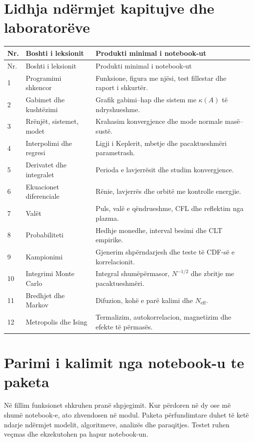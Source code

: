 \section{Lidhja ndërmjet kapitujve dhe laboratorëve}
\begin{longtable}{p{}p{}p{}}
\toprule
Nr. & Boshti i leksionit & Produkti minimal i notebook-ut\\ \midrule
\endfirsthead
\toprule Nr. & Boshti i leksionit & Produkti minimal i notebook-ut\\ \midrule\endhead
1 & Programimi shkencor & Funksione, figura me njësi, test fillestar dhe raport i shkurtër.\\
2 & Gabimet dhe kushtëzimi & Grafik gabimi--hap dhe sistem me $\kappa(A)$ të ndryshueshme.\\
3 & Rrënjët, sistemet, modet & Krahasim konvergjence dhe mode normale masë--sustë.\\
4 & Interpolimi dhe regresi & Ligji i Keplerit, mbetje dhe pacaktueshmëri parametrash.\\
5 & Derivatet dhe integralet & Perioda e lavjerrësit dhe studim konvergjence.\\
6 & Ekuacionet diferenciale & Rënie, lavjerrës dhe orbitë me kontrolle energjie.\\
7 & Valët & Puls, valë e qëndrueshme, CFL dhe reflektim nga plazma.\\
8 & Probabiliteti & Hedhje monedhe, interval besimi dhe CLT empirike.\\
9 & Kampionimi & Gjenerim shpërndarjesh dhe teste të CDF-së e korrelacionit.\\
10 & Integrimi Monte Carlo & Integral shumëpërmasor, $N^{-1/2}$ dhe zbritje me pacaktueshmëri.\\
11 & Bredhjet dhe Markov & Difuzion, kohë e parë kalimi dhe $N_{\mathrm{eff}}$.\\
12 & Metropolis dhe Ising & Termalizim, autokorrelacion, magnetizim dhe efekte të përmasës.\\
\bottomrule
\end{longtable}

\section{Parimi i kalimit nga notebook-u te paketa}
Në fillim funksionet shkruhen pranë shpjegimit. Kur përdoren në dy ose më shumë notebook-e, ato zhvendosen në modul. Paketa përfundimtare duhet të ketë ndarje ndërmjet modelit, algoritmeve, analizës dhe paraqitjes. Testet ruhen veçmas dhe ekzekutohen pa hapur notebook-un.

